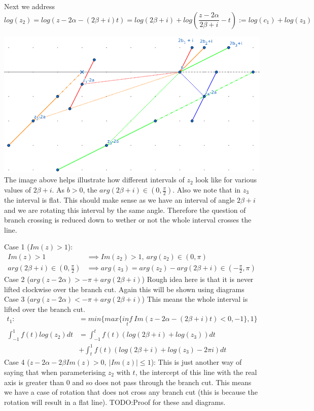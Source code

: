 \documentclass{article}
\begin{document}
Next we address
$$log(z_2)=log(z-2\alpha-(2\beta+i)t)=log(2\beta+i)+log(\frac{z-2\alpha}{2\beta+i}-t):=log(c_1)+log(z_3)$$

\includegraphics[width=\textwidth]{z23}
The image above helps illustrate how different intervals of $z_2$ look like for various values of $2\beta+i$.
As $b>0$, the $arg(2\beta+i)\in(0,\frac{\pi}{2})$.
Also we note that in $z_3$ the interval is flat.
This should make sense as we have an interval of angle $2\beta+i$ and we are rotating this interval by the same angle.
Therefore the question of branch crossing is reduced down to wether or not the whole interval crosses the line.

Case 1 ($Im(z)>1$):
\begin{align}
    Im(z)>1 &\implies Im(z_2)>1,\:arg(z_2)\in(0,\pi)\\
    arg(2\beta+i)\in(0,\frac{\pi}{2}) &\implies arg(z_3) = arg(z_2)-arg(2\beta + i) \in (-\frac{\pi}{2},\pi)
\end{align}
Case 2 ($arg(z-2\alpha)>-\pi+arg(2\beta+i)$)
Rough idea here is that it is never lifted clockwise over the branch cut.
Again this will be shown using diagrams
Case 3 ($arg(z-2\alpha)<-\pi+arg(2\beta+i)$)
This means the whole interval is lifted over the branch cut.
\begin{align}
    t_1 :&= min\{max\{\underset{t}{inf}\:Im(z-2\alpha-(2\beta+i)t)<0,-1\},1\}\\
    \int_{-1}^1f(t)log(z_2)dt &= \int_{-1}^tf(t)(log(2\beta+i)+log(z_3))dt\\
    &+\int_t^1f(t)(log(2\beta+i)+log(z_3)-2\pi i)dt
\end{align}
Case 4 ($z-2\alpha-2\beta Im(z)>0,\: |Im(z)|\leq 1$):
This is just another way of saying that when parameterising $z_2$ with $t$, the intercept of this line with the real axis is greater than $0$ and so does not pass through the branch cut.
This means we have a case of rotation that does not cross any branch cut (this is because the rotation will result in a flat line).
TODO:Proof for these and diagrams.
\end{document}
